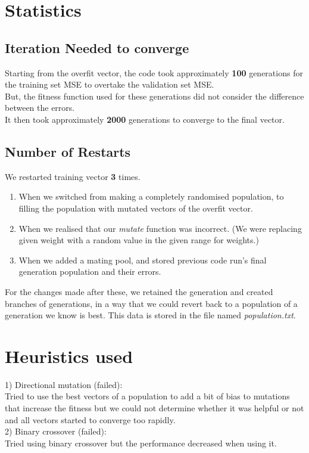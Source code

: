 \documentclass[10pt]{report}
\theoremstyle{definition}
\theoremstyle{plain}
\begin{document}
\section*{Statistics}
\subsection*{Iteration Needed to converge}
Starting from the overfit vector, the code took approximately \textbf{100} generations for the training set MSE to overtake the validation set MSE. \\
But, the fitness function used for these generations did not consider the difference between the errors. \\
It then took approximately \textbf{2000} generations to converge to the final vector.

\subsection*{Number of Restarts}
We restarted training vector \textbf{3} times.
\begin{enumerate}
    \item When we switched from making a completely randomised population, to filling the population with mutated vectors of the overfit vector.
    \item When we realised that our \emph{mutate} function was incorrect. (We were replacing given weight with a random value in the given range for weights.)
    \item When we added a mating pool, and stored previous code run's final generation population and their errors.
\end{enumerate}
For the changes made after these, we retained the generation and created branches of generations, in a way that we could revert back to a population of a generation we know is best. This data is stored in the file named \emph{population.txt}.

\section*{Heuristics used}
1) Directional mutation (failed): \\
Tried to use the best vectors of a population to add a bit of bias to mutations that increase the fitness but we could not determine whether it was helpful or not and all vectors started to converge too rapidly. \\

2) Binary crossover (failed): \\
Tried using binary crossover but the performance decreased when using it. \\
\end{document}
